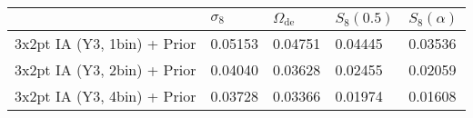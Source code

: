 \begin{tabular}{lllll}
\toprule
{} & $\sigma_8$ & $\Omega_\mathrm{de}$ & $S_8(0.5)$ & $S_8(\alpha)$ \\
\midrule
3x2pt IA (Y3, 1bin) + Prior &    0.05153 &              0.04751 &    0.04445 &       0.03536 \\
3x2pt IA (Y3, 2bin) + Prior &    0.04040 &              0.03628 &    0.02455 &       0.02059 \\
3x2pt IA (Y3, 4bin) + Prior &    0.03728 &              0.03366 &    0.01974 &       0.01608 \\
\bottomrule
\end{tabular}
